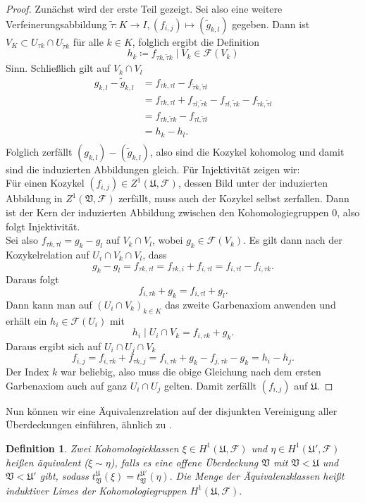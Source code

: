 \documentclass[11pt,a4paper,toc=bibliography]{scrartcl}
\theoremstyle{thm}
\theoremstyle{def}
\newtheorem{defi}{Definition}[section]
\theoremstyle{remark}
\begin{document}
\begin{proof}
Zunächst wird der erste Teil gezeigt. Sei also eine weitere Verfeinerungsabbildung  $\tilde{\tau}:K\rightarrow I, (f_{i,j})\mapsto (\tilde{g}_{k,l})$ gegeben. Dann ist $V_K\subset U_{\tau k}\cap U_{\tilde{\tau}k}$ für alle $k\in K$, folglich ergibt die Definition 
\[
h_k\coloneqq f_{\tau k,\tilde{\tau} k}\mid V_k\in \mathcal{F}(V_k)
\]
Sinn. Schließlich gilt auf $V_k\cap V_l$
\begin{align*}
g_{k,l}-\tilde{g}_{k,l} & =f_{\tau k,\tau l}-f_{\tilde{\tau}k,\tilde{\tau}l}\\
& =f_{\tau k,\tau l} +f_{\tau l,\tilde{\tau}k}-f_{\tau l,\tilde{\tau}k}-f_{\tilde{
\tau} k,\tilde{\tau}l}\\ 
						& = f_{\tau k, \tilde{\tau}k}-f_{\tau l,\tilde{\tau}l}\\
					& = h_k-h_l.\\
\end{align*}
Folglich zerfällt $(g_{k,l})-(\tilde{g}_ {k,l})$, also sind die Kozykel kohomolog und damit sind die induzierten Abbildungen gleich.
Für Injektivität zeigen wir:\\
Für einen Kozykel $(f_{i,j})\in Z^1(\mathfrak{U},\mathcal{F})$, dessen Bild unter der induzierten Abbildung in $Z^1(\mathfrak{V},\mathcal{F})$ zerfällt, muss auch der Kozykel selbst zerfallen.  Dann ist der Kern der induzierten Abbildung zwischen den Kohomologiegruppen $0$, also folgt Injektivität.\\
Sei also $f_{\tau k,\tau l}=g_k-g_l$ auf $V_k\cap V_l$, wobei $g_k\in \mathcal{F}(V_k)$. Es gilt dann nach der Kozykelrelation auf $U_i\cap V_k\cap V_l$, dass
\[
g_k-g_l= f_{\tau k,\tau l}=f_{\tau k,i}+f_{i,\tau l}=f_{i,\tau l}-f_{i,\tau k}.
\]
Daraus folgt
\[
f_{i,\tau k}+g_k = f_{i,\tau l}+g_l.
\]
Dann kann man auf $(U_i\cap V_k)_{k\in K}$ das zweite Garbenaxiom anwenden und erhält  ein $h_i\in \mathcal{F}(U_i)$ mit
\[
h_i\mid U_i\cap V_k = f_{i,\tau k}+g_k.
\]
Daraus ergibt sich auf $U_i\cap U_j\cap V_k$ 
\[
f_{i,j} = f_{i,\tau k}+f_{\tau k,j} = f_{i,\tau k}+g_k-f_{j,\tau k}-g_k=h_i-h_j.
\]
Der Index $k$ war beliebig, also muss die obige Gleichung nach dem ersten Garbenaxiom auch auf ganz $U_i\cap U_j$ gelten. Damit zerfällt $(f_{i,j})$ auf $\mathfrak{U}$.
\end{proof}
Nun können wir eine Äquivalenzrelation auf der disjunkten Vereinigung aller Überdeckungen einführen, ähnlich zu .
\begin{defi}
	Zwei Kohomologieklassen $\xi\in H^1(\mathfrak{U},\mathcal{F})$ und $\eta\in H^1(\mathfrak{U'},\mathcal{F})$ heißen äquivalent ($\xi\sim\eta$), falls es eine offene Überdeckung $\mathfrak{V}$ mit $\mathfrak{V}<\mathfrak{U}$ und $\mathfrak{V}< \mathfrak{U'}$ gibt, sodass $t^{\mathfrak{U}}_{\mathfrak{V}}(\xi)=t^{\mathfrak{U'}}_{\mathfrak{V}}(\eta).$
	Die Menge der Äquivalenzklassen heißt \emph{induktiver Limes} der Kohomologiegruppen $H^1(\mathfrak{U},\mathcal{F}).$
\end{defi}
\end{document}
